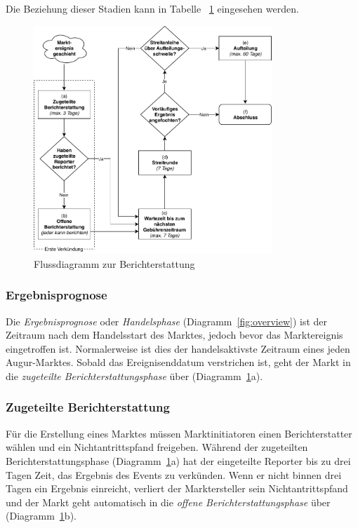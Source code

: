 \documentclass[floatfix,reprint,nofootinbib,amsmath,amssymb,epsfig,pre,floats,letterpaper,groupedaffiliation]{revtex4-1}
\theoremstyle{definition}
\theoremstyle{definition}
\theoremstyle{definition}
\begin{document}
Die Beziehung dieser Stadien kann in Tabelle ~\ref{fig:reporting} eingesehen werden.

\begin{figure}
\includegraphics[width=0.8\textwidth]{reporting.pdf}
\caption{Flussdiagramm zur Berichterstattung}
\label{fig:reporting}
\end{figure}

\subsubsection{Ergebnisprognose}

Die \textit{Ergebnisprognose} oder \textit{Handelsphase} (Diagramm~\ref{fig:overview}) ist der Zeitraum nach dem Handelsstart des Marktes, jedoch bevor das Marktereignis eingetroffen ist. Normalerweise ist dies der handelsaktivste Zeitraum eines jeden Augur-Marktes. Sobald das Ereignisenddatum verstrichen ist, geht der Markt in die \textit{zugeteilte Berichterstattungsphase} über (Diagramm~\ref{fig:reporting}a).

\subsubsection{Zugeteilte Berichterstattung}

Für die Erstellung eines Marktes müssen Marktinitiatoren einen Berichterstatter wählen und ein Nichtantrittspfand freigeben. Während der zugeteilten Berichterstattungsphase (Diagramm~\ref{fig:reporting}a) hat der eingeteilte Reporter bis zu drei Tagen Zeit, das Ergebnis des Events zu verkünden. Wenn er nicht binnen drei Tagen ein Ergebnis einreicht, verliert der Marktersteller sein Nichtantrittspfand und der Markt geht automatisch in die \textit{offene Berichterstattungsphase} über (Diagramm~\ref{fig:reporting}b).
\end{document}
